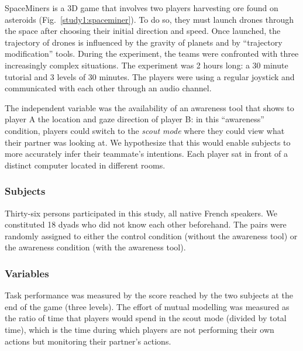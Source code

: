 \documentclass[natbib]{svjour3}
\newcommand{\A}{A\xspace}
\newcommand{\B}{B\xspace}
\begin{document}
{\sc SpaceMiners} is a 3D game that involves two players harvesting ore
found on asteroids (Fig.~\ref{study1:spaceminer}). To do so, they must launch
drones through the space after choosing their initial direction and speed. Once
launched, the trajectory of drones is influenced by the gravity of planets
and by ``trajectory modification'' tools. During the experiment, the teams were
confronted with three increasingly complex situations. The experiment was 2
hours long: a 30 minute tutorial and 3 levels of 30 minutes. The players were using
a regular joystick and communicated with each other through an audio channel.

The independent variable was the availability of an awareness tool that shows to
player \A  the location and gaze direction of player \B: in this ``awareness''
condition, players could switch to the \emph{scout mode} where they could view
what their partner was looking at. We hypothesize that this would enable
subjects to more accurately infer their teammate's intentions. Each player sat
in front of a distinct computer located in different rooms. 

\subsubsection*{Subjects}

Thirty-six persons participated in this study, all native French speakers. We
constituted 18 dyads who did not know each other beforehand. The pairs were
randomly assigned to either the control condition (without the awareness tool)
or the awareness condition (with the awareness tool).

\subsubsection*{Variables}

Task performance was measured by the score reached by the two subjects at the
end of the game (three levels). The effort of mutual modelling was measured as
the ratio of time that players would spend in the scout mode (divided by total
time), which is the time during which players are not performing their own
actions but monitoring their partner's actions.
\end{document}
